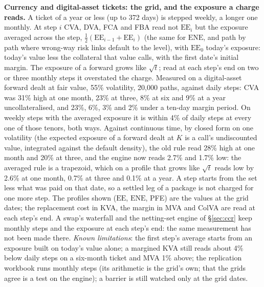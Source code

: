\documentclass[11pt,a4paper]{article}
\begin{document}
\textbf{Currency and digital-asset tickets: the grid, and the exposure a charge reads.} A ticket of a year or less (up to 372 days) is stepped weekly, a longer one monthly. At step $i$ CVA, DVA, FCA and FBA read not $\mathrm{EE}_i$ but the exposure averaged across the step, $\tfrac12(\mathrm{EE}_{i-1}+\mathrm{EE}_i)$ (the same for $\mathrm{ENE}$, and path by path where wrong-way risk links default to the level), with $\mathrm{EE}_0$ today's exposure: today's value less the collateral that value calls, with the first date's initial margin. The exposure of a forward grows like $\sqrt{t}$; read at each step's end on two or three monthly steps it overstated the charge. Measured on a digital-asset forward dealt at fair value, 55\% volatility, 20,000 paths, against daily steps: CVA was 31\% high at one month, 23\% at three, 8\% at six and 9\% at a year uncollateralised, and 23\%, 6\%, 3\% and 2\% under a ten-day margin period. On weekly steps with the averaged exposure it is within 4\% of daily steps at every one of those tenors, both ways. Against continuous time, by closed form on one volatility (the expected exposure of a forward dealt at $K$ is a call's undiscounted value, integrated against the default density), the old rule read 28\% high at one month and 20\% at three, and the engine now reads 2.7\% and 1.7\% low: the averaged rule is a trapezoid, which on a profile that grows like $\sqrt{t}$ reads low by 2.6\% at one month, 0.7\% at three and 0.1\% at a year. A step starts from the set less what was paid on that date, so a settled leg of a package is not charged for one more step. The profiles shown ($\mathrm{EE}$, $\mathrm{ENE}$, PFE) are the values at the grid dates; the replacement cost in KVA, the margin in MVA and ColVA are read at each step's end. A swap's waterfall and the netting-set engine of \S\ref{sec:ccr} keep monthly steps and the exposure at each step's end: the same measurement has not been made there. \emph{Known limitations}: the first step's average starts from an exposure built on today's value alone; a margined KVA still reads about 4\% below daily steps on a six-month ticket and MVA 1\% above; the replication workbook runs monthly steps (its arithmetic is the grid's own; that the grids agree is a test on the engine); a barrier is still watched only at the grid dates.
\end{document}
